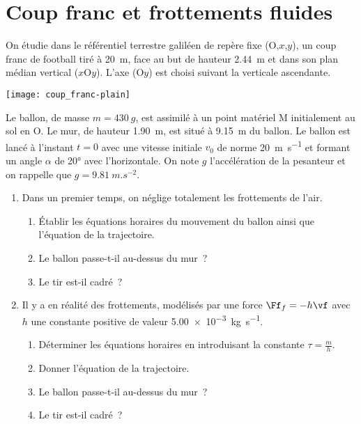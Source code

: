 \documentclass[a4paper, 12pt, final, garamond]{book}
\begin{document}

\section{Coup franc et frottements fluides}

\begin{minipage}{0.45\linewidth}
    On étudie dans le référentiel terrestre galiléen de repère fixe (O,$x$,$y$),
    un coup franc de football tiré à \SI{20}{m}, face au but de hauteur
    \SI{2,44}{m} et dans son plan médian vertical ($x$O$y$). L'axe (O$y$) est
    choisi suivant la verticale ascendante.
\end{minipage}
\hfill
\begin{minipage}{0.45\linewidth}
    \begin{center}
        \texttt{[image: coup\_franc-plain]}
    \end{center}
\end{minipage}

Le ballon, de masse $m = \SI{430}{g}$, est assimilé à un point matériel M
initialement au sol en O. Le mur, de hauteur \SI{1,90}{m}, est situé à
\SI{9,15}{m} du ballon. Le ballon est lancé à l'instant $t = 0$ avec une vitesse
initiale $v_0$ de norme \SI{20}{m.s^{-1}} et formant un angle $\alpha$ de
\ang{20;;} avec l'horizontale. On note $g$ l'accélération de la pesanteur et on
rappelle que $g = \SI{9,81}{m.s^{-2}}$. \bigbreak
\begin{enumerate}
    \item Dans un premier temps, on néglige totalement les frottements de l'air.
        \begin{enumerate}
            \item Établir les équations horaires du mouvement du ballon ainsi
                que l'équation de la trajectoire.
            \item Le ballon passe-t-il au-dessus du mur~?
            \item Le tir est-il cadré~?
        \end{enumerate}
    \item Il y a en réalité des frottements, modélisés par une force $\Ff_f =
        -h\vf$ avec $h$ une constante positive de valeur
        \SI{5.00e-3}{kg.s^{-1}}.
        \begin{enumerate}
            \item Déterminer les équations horaires en introduisant la constante
                $\tau = \frac{m}{h}$.
            \item Donner l'équation de la trajectoire.
            \item Le ballon passe-t-il au-dessus du mur~?
            \item Le tir est-il cadré~?
        \end{enumerate}
\end{enumerate}
\end{document}

